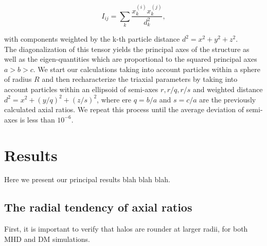 \documentclass[a4paper,fleqn,usenatbib]{mnras}
\begin{document}
\begin{equation}
I_{ij} = \sum_k \frac{x_k^{(i)}x_k^{(j)}}{d^2_k},
\label{eq:inertia}
\end{equation}

with components weighted by the k-th particle distance $d^2=x^2+y^2+z^2$.\\

The diagonalization of this tensor yields the principal axes of the structure as well as the eigen-quantities which are proportional to the squared principal axes $a>b>c$. We start our calculations taking into account particles within a sphere of radius $R$ and then recharacterize the triaxial parameters by taking into account particles within an ellipsoid of semi-axes $r,r/q,r/s$ and weighted distance $d^2=x^2+(y/q)^2+(z/s)^2$, where ere $q = b/a$ and $s=c/a$ are the previously calculated axial ratios. We repeat this process until the average deviation of semi-axes is less than $10^{-6}$.\\

\section{Results}
Here we present our principal results blah blah blah.

\subsection{The radial tendency of axial ratios}
First, it is important to verify that halos are rounder at larger radii, for both MHD and DM simulations.
\end{document}
